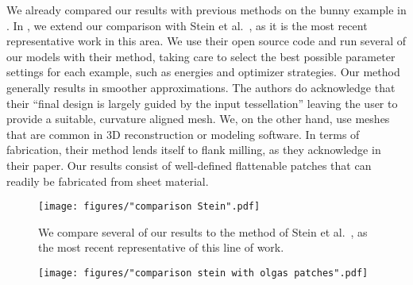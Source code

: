 We already compared our results with previous methods on the bunny example in . In , we extend our comparison with Stein et al.~, as it is the most recent representative work in this area. We use their open source code and run several of our models with their method, taking care to select the best possible parameter settings for each example, such as energies and optimizer strategies. 
Our method generally results in smoother approximations.
The authors do acknowledge that their ``final design is largely guided by the input tessellation'' leaving the user to provide a suitable, curvature aligned mesh. We, on the other hand, use meshes that are common in 3D reconstruction or modeling software. In terms of fabrication, their method lends itself to flank milling, as they acknowledge in their paper. 
Our results consist of well-defined flattenable patches that can readily be fabricated from sheet material. 

\begin{figure} [h]
    \centering
    \noindent\texttt{[image: figures/"comparison Stein".pdf]}
    \caption{
        We compare several of our results to the method of Stein et al.~, as the most recent representative of this line of work. 
        \label{fig:compare_stein}}
\end{figure}

\begin{figure} [h]
    \centering
    \noindent\texttt{[image: figures/"comparison stein with olgas patches".pdf]}
    \caption{
        \label{fig:compare_stein_patches}}
\end{figure}




